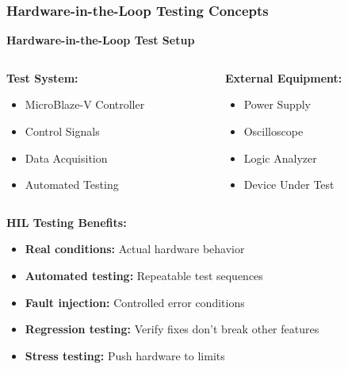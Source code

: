 \documentclass{beamer}
\begin{document}
\begin{frame}
\frametitle{Hardware-in-the-Loop Testing Concepts}
\begin{center}
\textbf{Hardware-in-the-Loop Test Setup}
\end{center}

\begin{columns}
\begin{column}{0.5\textwidth}
\textbf{Test System:}
\begin{itemize}
    \item MicroBlaze-V Controller
    \item Control Signals
    \item Data Acquisition
    \item Automated Testing
\end{itemize}
\end{column}
\begin{column}{0.5\textwidth}
\textbf{External Equipment:}
\begin{itemize}
    \item Power Supply
    \item Oscilloscope
    \item Logic Analyzer
    \item Device Under Test
\end{itemize}
\end{column}
\end{columns}

\vspace{0.5cm}
\textbf{HIL Testing Benefits:}
\begin{itemize}
    \item \textbf{Real conditions:} Actual hardware behavior
    \item \textbf{Automated testing:} Repeatable test sequences
    \item \textbf{Fault injection:} Controlled error conditions
    \item \textbf{Regression testing:} Verify fixes don't break other features
    \item \textbf{Stress testing:} Push hardware to limits
\end{itemize}
\end{frame}
\end{document}

